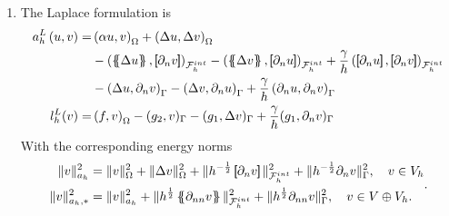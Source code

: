 \begin{enumerate}[label=\arabic*)]
\item The Laplace formulation is
    \begin{equation}
        \label{eq:cip_laplace_form}
        \begin{split}
            a_{h}^{L} \left( u, v \right)   =&
            \left( \alpha  u, v \right) _{\Omega }   +  \left( \Delta  u, \Delta v \right) _{ \Omega } \\
                                             & - \left( \mean{  \Delta  u }, \jump{ \partial _{n }v} \right)_{\mathcal{F}_{h}^{int}  }  - \left( \mean{ \Delta  v }, \jump{ \partial _{n}u }      \right)_{\mathcal{F}_{h}^{int}  }  + \frac{\gamma }{h}
                                             \left( \jump{ \partial _{n} u}, \jump{ \partial _{n} v   }   \right)_{\mathcal{F}_{h}^{int} } \\
                                             & - \left(   \Delta  u ,  \partial _{n }v \right)_{\Gamma   }  - \left(  \Delta  v ,  \partial _{n}u       \right)_{\Gamma  }  + \frac{\gamma }{h}  \left(  \partial _{n} u,  \partial _{n} v      \right)_{ \Gamma } \\
                                             l^{L}_{h}( v)  =&  \left( f, v \right) _{\Omega } - ( g_{2},  v )_{\Gamma } -  ( g_{1}, \Delta  v  )_{\Gamma }  + \frac{\gamma }{h} ( g_{1}, \partial _{n} v  )_{\Gamma }
                                         \end{split}
                                     \end{equation}
                                     With the corresponding energy norms
                                     \begin{equation}
                                         \label{eq:a_cip_energy_norm_lap}
                                         \begin{split}
                                             \| v \|_{ a_{h} }^{ 2 }& =  \| v\|_{ \Omega  }^{2  }  +  \| \Delta   v \|_{ \Omega   }^{ 2 }  + \|  h^{-\frac{1}{2}} \jump{ \partial _{n} v    }\|_{  \mathcal{F} _{h}^{int} }^{2  } +  \|  h^{-\frac{1}{2}}
                                             \partial _{n} v  \|_{  \Gamma  }^{2  },  \quad v \in V_{h}  \\
                                             \| v \|_{ a_{h},* }^{ 2 } &= \| v \|_{ a_{h} }^{ 2 }  + \| h^{\frac{1}{2}}  \mean{     \partial _{nn } v}  \|_{ \mathcal{F}_{h}^{int}   }^{  2}+ \| h^{\frac{1}{2}}       \partial _{nn } v  \|_{ \Gamma    }^{  2}, \quad  v\in V \oplus V_{h}.
                                         \end{split}
                                         .
                                     \end{equation}


\end{enumerate}


